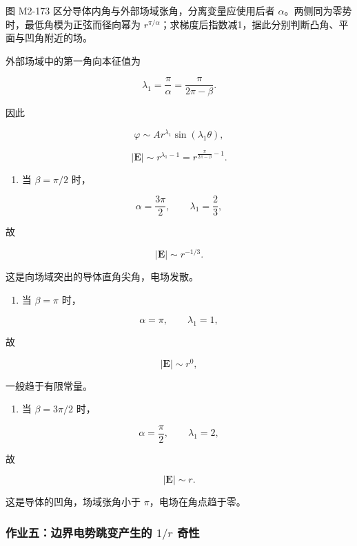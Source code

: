 图 M2-173 区分导体内角与外部场域张角，分离变量应使用后者
\(\alpha\)。两侧同为零势时，最低角模为正弦而径向幂为
\(r^{\pi/\alpha}\)；求梯度后指数减1，据此分别判断凸角、平面与凹角附近的场。

外部场域中的第一角向本征值为

\[
\lambda_1=\frac{\pi}{\alpha}
=
\frac{\pi}{2\pi-\beta}.
\]

因此

\[
\varphi
\sim
A r^{\lambda_1}
\sin(\lambda_1\theta),
\]

\[
\boxed{
|\mathbf E|
\sim
r^{\lambda_1-1}
=
r^{\frac{\pi}{2\pi-\beta}-1}
}.
\]

\begin{enumerate}
\def\labelenumi{\arabic{enumi}.}
\tightlist
\item
  当 \(\beta=\pi/2\) 时，
\end{enumerate}

\[
\alpha=\frac{3\pi}{2},
\qquad
\lambda_1=\frac23,
\]

故

\[
\boxed{|\mathbf E|\sim r^{-1/3}}.
\]

这是向场域突出的导体直角尖角，电场发散。

\begin{enumerate}
\def\labelenumi{\arabic{enumi}.}
\setcounter{enumi}{1}
\tightlist
\item
  当 \(\beta=\pi\) 时，
\end{enumerate}

\[
\alpha=\pi,\qquad \lambda_1=1,
\]

故

\[
\boxed{|\mathbf E|\sim r^0},
\]

一般趋于有限常量。

\begin{enumerate}
\def\labelenumi{\arabic{enumi}.}
\setcounter{enumi}{2}
\tightlist
\item
  当 \(\beta=3\pi/2\) 时，
\end{enumerate}

\[
\alpha=\frac{\pi}{2},
\qquad
\lambda_1=2,
\]

故

\[
\boxed{|\mathbf E|\sim r}.
\]

这是导体的凹角，场域张角小于 \(\pi\)，电场在角点趋于零。

\subsubsection{\texorpdfstring{作业五：边界电势跳变产生的 \(1/r\)
奇性}{作业五：边界电势跳变产生的 1/r 奇性}}\label{m2:ux4f5cux4e1aux4e94ux8fb9ux754cux7535ux52bfux8df3ux53d8ux4ea7ux751fux7684-1r-ux5947ux6027}

